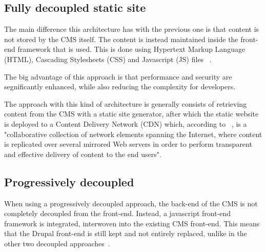 
\subsection{Fully decoupled static site}

The main difference this architecture has with the previous one is that content is not stored by the CMS itself. The content is instead maintained inside the front-end framework that is used. This is done using Hypertext Markup Language (HTML), Cascading Stylesheets (CSS) and Javascript (JS) files ~\autocite{Dropsolid2021}.

The big advantage of this approach is that performance and security are segnificantly enhanced, while also reducing the complexity for developers.

The approach with this kind of architecture is generally consists of retrieving content from the CMS with a static site generator, after which the static website is deployed to a Content Delivery Network (CDN) which, according to ~\textcite{Buyya2008}, is a "collaborative collection of network elements spanning the Internet, where content is replicated over
several mirrored Web servers in order to perform transparent and effective delivery of content to the end users".


\subsection{Progressively decoupled}

When using a progressively decoupled approach, the back-end of the CMS is not completely decoupled from the front-end. Instead, a javascript front-end framework is integrated, interwoven into the existing CMS front-end. This means that the Drupal front-end is still kept and not entirely replaced, unlike in the other two decoupled approaches~\autocite{So2018}. 

